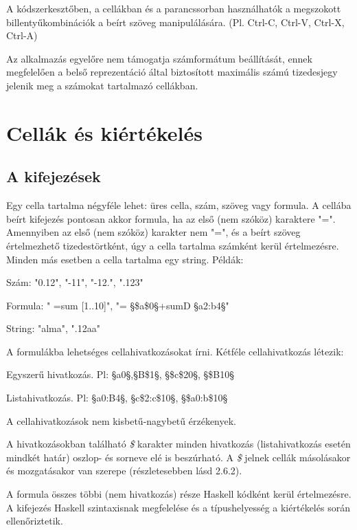 A kódszerkesztőben, a cellákban és a parancssorban használhatók a megszokott billentyűkombinációk a beírt szöveg manipulálására. (Pl. Ctrl-C, Ctrl-V, Ctrl-X, Ctrl-A)

Az alkalmazás egyelőre nem támogatja számformátum beállítását, ennek megfelelően a belső reprezentáció által biztosított maximális számú tizedesjegy jelenik meg a számokat tartalmazó cellákban.

\section{Cellák és kiértékelés}

\subsection{A kifejezések}

Egy cella tartalma négyféle lehet: üres cella, szám, szöveg vagy formula. A cellába beírt kifejezés pontosan akkor formula, ha az első (nem szóköz) karaktere "=". Amennyiben az első (nem szóköz) karakter nem "=", és a beírt szöveg értelmezhető tizedestörtként, úgy a cella tartalma számként kerül értelmezésre. Minden más esetben a cella tartalma egy string. Példák:
\begin{compactenum}
	\item Szám: "0.12", "-11", "-12.", ".123"
	\item Formula: " =sum [1..10]", "= §\$a\$0§+sumD §a2:b4§"
	\item String: "alma", ".12aa"
\end{compactenum}

A formulákba lehetséges cellahivatkozásokat írni. Kétféle cellahivatkozás létezik:
\begin{compactenum}
	\item Egyszerű hivatkozás. Pl: §a0§,§B\$1§, §\$c\$20§, §\$B10§
	\item Listahivatkozás. Pl: §a0:B4§, §c\$2:c\$10§, §\$a0:b\$10§
\end{compactenum}

A cellahivatkozások nem kisbetű-nagybetű érzékenyek.

A hivatkozásokban található \textit{\$} karakter minden hivatkozás (listahivatkozás esetén mindkét határ) oszlop- és sorneve elé is beszúrható. A \textit{\$} jelnek cellák másolásakor és mozgatásakor van szerepe (részletesebben lásd 2.6.2).

A formula összes többi (nem hivatkozás) része Haskell kódként kerül értelmezésre. A kifejezés Haskell szintaxisnak megfelelése és a típushelyesség a kiértékelés során ellenőriztetik.

